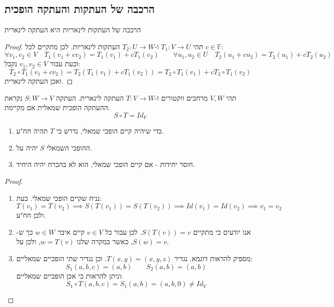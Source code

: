 \documentclass{tstextbook}
\begin{document}
\subsection{הרכבה של העתקות והעתקה הופכית}

\begin{proposition}
הרכבה של העתקות לינאריות היא העתקה לינארית

\end{proposition}
\begin{proof}
תהי \(T_{1}:V\to U\) ו-\(T_{2}:U\to W\) העתקות לינאריות. לכן מתקיים לכל \(c \in \mathbb{F}\):
$$\forall v_{1},v_{2} \in V\quad T_{1}(v_{1}+cv_{2})=T_{1}(v_{1})+cT_{1}(v_{2})\qquad \forall u_{1},u_{2} \in U\quad  T_{2}(u_{1}+cu_{2})=T_{2}(u_{1})+cT_{2}(u_{2})$$
וכעת עבור \(v_{1},v_{2} \in V\) נקבל:
$$T_{2}\circ T_{1}(v_{1}+cv_{2})=T_{2}(T_{1}(v_{1})+cT_{1}(v_{2}))=T_{2}\circ T_{1}(v_{1})+cT_{2}\circ T_{1}(v_{2})$$
ואכן העתקה לינארית.

\end{proof}
\begin{definition}
תהי \(V, W\)  מרחבים ווקטורים ו-\(T:V\to W\) העתקה לינארית. העתקה \(S:W\to V\) נקראת ההעתקה הופכית שמאלית אם מקיימת:
$$S\circ  T=Id_{V}$$

\end{definition}
\begin{proposition}
  \begin{enumerate}
    \item כדי שיהיה קיים הופכי שמאלי, נדרש כי \(T\) תהיה חח"ע. 


    \item ההופכי השמאלי \(S\) יהיה על. 


    \item חוסר יחידות - אם קיים הופכי שמאלי, הוא לא בהכרח יהיה היחיד. 


  \end{enumerate}
\end{proposition}
\begin{proof}
  \begin{enumerate}
    \item נניח שקיים הופכי שמאלי. כעת: 
$$T(v_{1})=T(v_{2})\implies S(T(v_{1}))=S(T(v_{2}))\implies Id(v_{1})=Id(v_{2})\implies v_{1}=v_{2}$$
ולכן חח"ע.


    \item אנו יודעים כי מתקיים \(S(T(v))=v\). לכן עבור כל \(v \in V\) קיים איבר \(w \in W\) כך ש-\(S(w)=v\), כאשר במקרה שלנו \(w=T(v)\), ולכן על. 


    \item מספיק להראות דוגמא. נגדיר \(T(x,y)=(x,y,z)\). וכן נגדיר שתי הופכיים שמאליים: 
$$S_{1}(a,b,c)=(a,b)\qquad S_{2}(a,b)=(a,b)$$
וניתן להראות כי אכן הופכיים שמאליים:
$$S_{1}\circ  T(a,b,c)=S_{1}(a,b)=(a,b,0)\neq Id_{V}$$


  \end{enumerate}
\end{proof}
\end{document}

